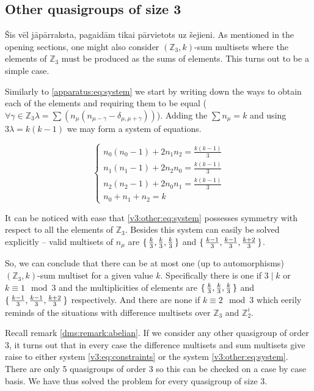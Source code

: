 \subsection{Other quasigroups of size 3}
Šis vēl jāpārraksta, pagaidām tikai pārvietots uz šejieni.
    \label{sec:v3}
    As mentioned in the opening sections, one might also consider $(\mathbb Z_3,k)$-sum multisets where the elements of $\mathbb Z_3$ must be produced as the sums of elements. This turns out to be a simple case.

    Similarly to \eqref{apparatus:eq:system} we start by writing down the ways to obtain each of the elements and requiring them to be equal ($\forall \gamma \in \mathbb Z_3 \lambda = \sum (n_\mu (n_{\mu-\gamma}-\delta_{\mu,\mu+\gamma}))$). Adding the $\sum n_\mu = k$ and using $3\lambda = k(k-1)$ we may form a system of equations.
    
    \begin{equation}
        \label{v3:other:eq:system}
        \begin{cases}
            n_0 (n_0-1) + 2 n_1 n_2 = \frac{k(k-1)}{3} \\
            n_1 (n_1-1) + 2 n_2 n_0 = \frac{k(k-1)}{3} \\
            n_2 (n_2-1) + 2 n_0 n_1 = \frac{k(k-1)}{3} \\
            n_0 + n_1 + n_2 = k
        \end{cases}
    \end{equation}

    It can be noticed with ease that \eqref{v3:other:eq:system} possesses symmetry with respect to all the elements of $\mathbb Z_3$. Besides this system can easily be solved explicitly -- valid multisets of $n_\mu$ are $\set{\frac k 3, \frac k 3, \frac k 3}$ and $\set{\frac{k-1}{3}, \frac{k-1}{3}, \frac{k+2}{3}}$.
    
    So, we can conclude that there can be at most one (up to automorphisms) $(\mathbb Z_3, k)$-sum multiset for a given value $k$. Specifically there is one if $3 \mid k$ or $k \equiv 1 \mod 3$ and the multiplicities of elements are $\set{\frac k 3, \frac k 3, \frac k 3}$ and $\set{\frac{k-1}{3}, \frac{k-1}{3}, \frac{k+2}{3}}$ respectively. And there are none if $k \equiv 2 \mod 3$ which eerily reminds of the situations with difference multisets over $\mathbb Z_3$ and $\mathbb Z_2^i$.
    
    Recall remark \ref{dms:remark:abelian}. If we consider any other quasigroup of order 3, it turns out that in every case the difference multisets and sum multisets give raise to either system \eqref{v3:eq:constraints} or the system \eqref{v3:other:eq:system}. There are only 5 quasigroups of order 3 so this can be checked on a case by case basis. We have thus solved the problem for every quasigroup of size 3.
    
